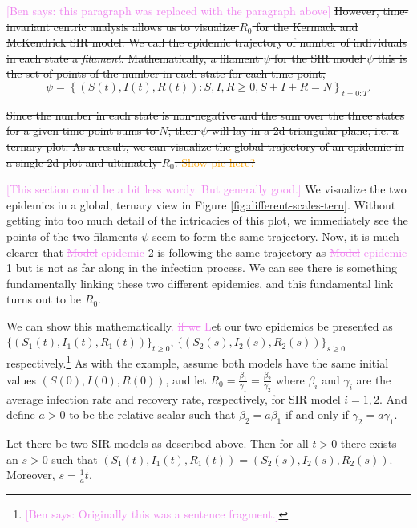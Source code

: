 \documentclass[
  shortnames]{jss}
\begin{document}
\textcolor{violet}{[Ben says: this paragraph was replaced with the paragraph above]}
\sout{However, time-invariant centric analysis allows us to visualize $R_0$ for the Kermack and McKendrick SIR model.  We call the epidemic trajectory of number of individuals in each state a \textit{filament}.  Mathematically, a filament $\psi$ for the SIR model  $\psi$ this is the set of points of the number in each state for each time point,}
\[
\psi = \left \{(S(t), I(t), R(t)): S, I, R \ge 0, S + I + R = N \right \}_{t=0:T}.
\]

\sout{Since the number in each state is non-negative and the sum over the three states for a given time point sums to $N$, then $\psi$ will lay in a 2d triangular plane, i.e. a ternary plot.  As a result, we can visualize the global trajectory of an epidemic in a single 2d plot and ultimately $R_0$.  \textcolor{orange}{Show pic here?}}

\textcolor{violet}{[This section could be a bit less wordy. But generally good.]}
We visualize the two epidemics in a global, ternary view in Figure
\ref{fig:different-scales-tern}. Without getting into too much detail of
the intricacies of this plot, we immediately see the points of the two
filaments \(\psi\) seem to form the same trajectory. Now, it is much
clearer that \textcolor{violet}{\sout{Model} epidemic} 2 is following
the same trajectory as \textcolor{violet}{\sout{Model} epidemic} 1 but
is not as far along in the infection process. We can see there is
something fundamentally linking these two different epidemics, and this
fundamental link turns out to be \(R_0\).

We can show this mathematically\textcolor{violet}{.\sout{ if we} L}et
our two epidemics be presented as
\(\{(S_1(t), I_1(t), R_1(t))\}_{t\geq0}\),
\(\{(S_2(s), I_2(s), R_2(s))\}_{s \geq 0}\)
respectively.\footnote{\textcolor{violet}{[Ben says: Originally this was a sentence fragment.]}}
As with the example, assume both models have the same initial values
\((S(0), I(0), R(0))\), and let
\(R_0 =\frac{\beta_1}{\gamma_1} = \frac{\beta_2}{\gamma_2}\) where
\(\beta_i\) and \(\gamma_i\) are the average infection rate and recovery
rate, respectively, for SIR model \(i=1, 2\). And define \(a>0\) to be
the relative scalar such that \(\beta_2 = a \beta_1\) if and only if
\(\gamma_2 = a \gamma_1\).

\begin{theorem}\label{thm:sir-scale}
Let there be two SIR models as described above.  Then for all $t > 0$ there exists an $s>0$ such that $(S_1(t), I_1(t), R_1(t)) = (S_2(s), I_2(s), R_2(s))$.  Moreover, $s = \frac{1}{a}t$.
\end{theorem}
\end{document}
